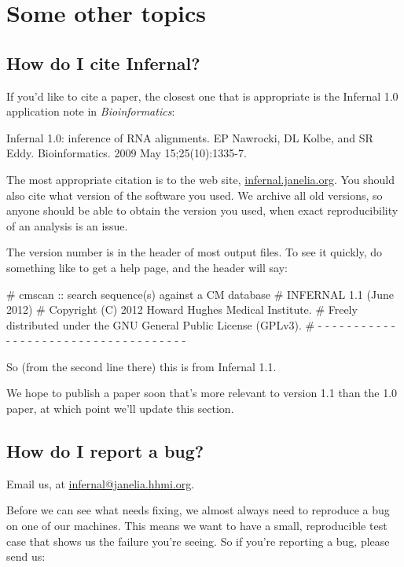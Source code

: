 \section{Some other topics}
\label{section:more}
\setcounter{footnote}{0}

\subsection{How do I cite Infernal?}

If you'd like to cite a paper, the closest one that is appropriate is
the Infernal 1.0 application note in \emph{Bioinformatics}:

Infernal 1.0: inference of RNA alignments. 
EP Nawrocki, DL Kolbe, and SR Eddy.
Bioinformatics. 2009 May 15;25(10):1335-7. 

The most appropriate citation is to the web site,
\url{infernal.janelia.org}. You should also cite what version of the
software you used. We archive all old versions, so anyone should be
able to obtain the version you used, when exact reproducibility of an
analysis is an issue.

The version number is in the header of most output files. To see it
quickly, do something like  to get a help page, and
the header will say:

\begin{sreoutput}
# cmscan :: search sequence(s) against a CM database
# INFERNAL 1.1 (June 2012)
# Copyright (C) 2012 Howard Hughes Medical Institute.
# Freely distributed under the GNU General Public License (GPLv3).
# - - - - - - - - - - - - - - - - - - - - - - - - - - - - - - - - - - - -
\end{sreoutput}

So (from the second line there) this is from Infernal 1.1.

We hope to publish a paper soon that's more relevant to version 1.1
than the 1.0 paper, at which point we'll update this section.

\subsection{How do I report a bug?}

Email us, at \url{infernal@janelia.hhmi.org}.

Before we can see what needs fixing, we almost always need to
reproduce a bug on one of our machines. This means we want to have a
small, reproducible test case that shows us the failure you're seeing.
So if you're reporting a bug, please send us:

